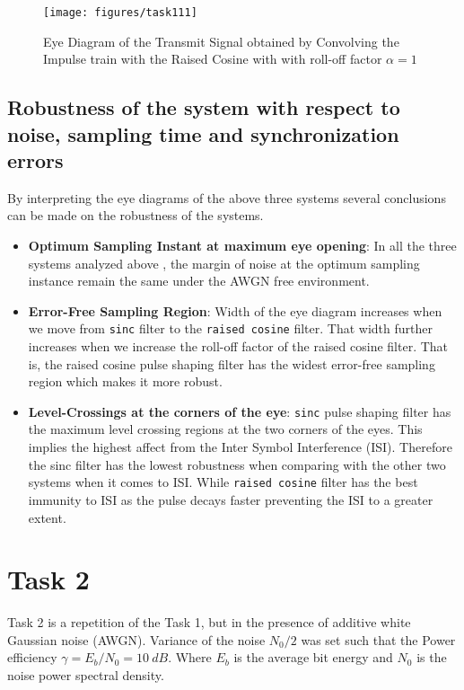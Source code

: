 \documentclass[a4paper,11pt]{article}%
\begin{document}
\begin{figure}[H]
	\centering
	\texttt{[image: figures/task111]}
	\caption{Eye Diagram of the Transmit Signal obtained by Convolving the Impulse train with the Raised Cosine with with roll-off factor $\alpha = 1$}
\end{figure}

\subsection{Robustness of the system with respect to noise, sampling time and synchronization errors}

By interpreting the eye diagrams of the above three systems several conclusions can be made on the robustness of the systems.

\begin{itemize}
	\item \textbf{Optimum Sampling Instant at maximum eye opening}: In all the three systems analyzed above , the margin of noise at the optimum sampling instance remain the same under the AWGN free environment.
	
	\item \textbf{Error-Free Sampling Region}: Width of the eye diagram increases when we move from { \tt sinc} filter to the {\tt raised cosine} filter. That width further increases when we increase the roll-off factor of the raised cosine filter. That is, the raised cosine pulse shaping filter has the widest error-free sampling region which makes it more robust.
	
	\item \textbf{Level-Crossings at the corners of the eye}: {\tt sinc} pulse shaping filter has the maximum level crossing regions at the two corners of the eyes. This implies the highest affect from the Inter Symbol Interference (ISI). Therefore the sinc filter has the lowest robustness when comparing with the other two systems when it comes to ISI. While {\tt raised cosine} filter has the best immunity to ISI as the pulse decays faster preventing the ISI to a greater extent.
	
\end{itemize}


\pagebreak
\section{Task 2}
Task 2 is a repetition of the Task 1, but in the presence of additive white Gaussian noise (AWGN). Variance of the noise $N_0/2$ was set such that the Power efficiency $\gamma = E_b/N_0 = 10 ~dB$. Where $E_b$ is the average bit energy and $N_0$ is the noise power spectral density.
\end{document}
